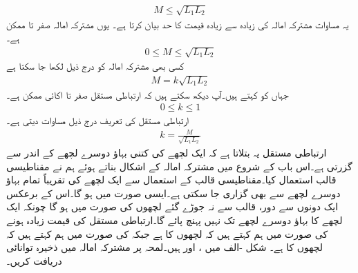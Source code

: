 \begin{align}
M\le \sqrt{L_1 L_2}
\end{align}
یہ مساوات مشترکہ امالہ کی زیادہ سے زیادہ قیمت کا حد بیان کرتا ہے۔  یوں مشترکہ امالہ صفر تا  ممکن ہے۔
\begin{align}
0\le M \le \sqrt{L_1 L_2}
\end{align}
 کسی بھی مشترکہ امالہ کو درج ذیل لکھا جا سکتا ہے
\begin{align}\label{مساوات_مقناطیسی_مشترک_امالہ_تعریف_الف}
M=k\sqrt{L_1 L_2}
\end{align}
جہاں  کو  کہتے ہیں۔آپ دیکھ سکتے ہیں کہ ارتباطی مستقل صفر تا اکائی ممکن ہے۔
\begin{align}
0 \le k \le 1
\end{align}
ارتباطی مستقل کی تعریف درج ذیل مساوات دیتی ہے۔
\begin{align}
k=\frac{M}{\sqrt{L_1 L_2}}
\end{align}
ارتباطی مستقل یہ بتلاتا ہے کہ ایک لچھے کی کتنی بہاؤ دوسرے لچھے کے اندر سے گزرتی ہے۔اس باب کے شروع میں مشترکہ امالہ کے اشکال بناتے ہوئے ہم نے مقناطیسی قالب استعمال کیا۔مقناطیسی قالب کے استعمال سے ایک لچھے کی تقریباً تمام بہاؤ دوسرے لچھے سے بھی گزاری جا سکتی ہے۔ایسی صورت میں  ہو گا۔اس کے برعکس ایک دونوں سے دور، قالب سے نہ جوڑے گئے لچھوں کی صورت میں  ہو گا چونکہ ایک لچھے کا بہاؤ دوسرے لچھے تک نہیں پہنچ پائے گا۔ارتباطی مستقل کی قیمت زیادہ  ہونے کی صورت میں ہم کہتے ہیں کہ لچھوں کا  ہے جبکہ  کی صورت میں ہم کہتے ہیں کہ لچھوں کا  ہے۔    
شکل -الف میں ،  اور  ہیں۔لمحہ  پر مشترکہ امالہ میں ذخیرہ توانائی دریافت کریں۔
